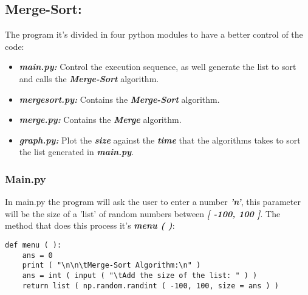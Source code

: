 \subsection{Merge-Sort:}

The program it's divided in four python modules to have a better control of the code:

\begin{itemize}
\item {\bfseries\itshape main.py:} Control the execution sequence, as well generate the list to sort and calls the {\bfseries\itshape Merge-Sort} algorithm.
\item {\bfseries\itshape mergesort.py:} Contains the {\bfseries\itshape Merge-Sort} algorithm.
\item {\bfseries\itshape merge.py:} Contains the {\bfseries\itshape Merge} algorithm.
\item {\bfseries\itshape graph.py:} Plot the {\bfseries\itshape size} against the {\bfseries\itshape time} that the algorithms takes to sort the list generated in {\bfseries\itshape main.py}. 
\end{itemize}

\subsubsection{Main.py}

In main.py the program will ask the user to enter a number {\bfseries\itshape 'n'}, this parameter will be the size of a 'list' of random numbers between {\bfseries\itshape [ -100, 100 ]}. The method that does this process it's {\bfseries\itshape menu ( )}: \hfill \break

\begin{lstlisting}
def menu ( ):
    ans = 0
    print ( "\n\n\tMerge-Sort Algorithm:\n" )
    ans = int ( input ( "\tAdd the size of the list: " ) )
    return list ( np.random.randint ( -100, 100, size = ans ) )
\end{lstlisting} \hfill

